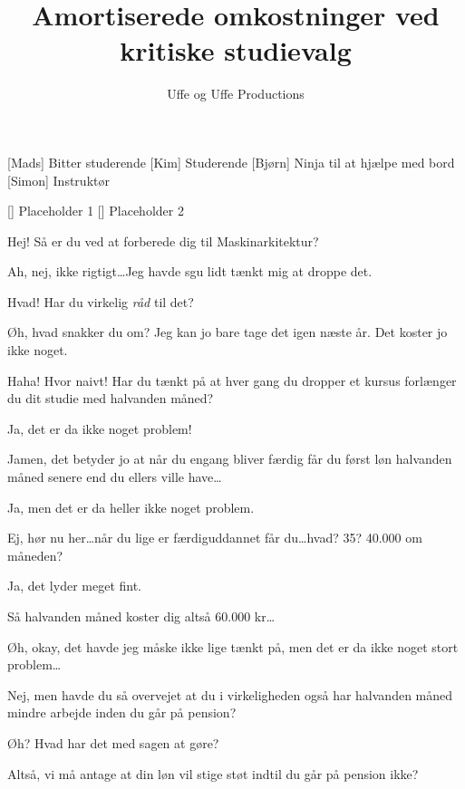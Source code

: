 \documentclass[a4paper,11pt]{article}
\title{Amortiserede omkostninger ved kritiske studievalg}
\author{Uffe og Uffe Productions\texttrademark}
\begin{document}
\maketitle

\begin{roles}
[Mads] Bitter studerende
[Kim] Studerende
[Bjørn] Ninja til at hjælpe med bord
[Simon] Instruktør
\end{roles}


\begin{props}
[] Placeholder 1
[] Placeholder 2
\end{props}

\begin{sketch}

 Hej! Så er du ved at forberede dig til Maskinarkitektur?

 Ah, nej, ikke rigtigt\dots Jeg havde sgu lidt tænkt mig at droppe det.

 Hvad! Har du virkelig \emph{råd} til det?

 Øh, hvad snakker du om? Jeg kan jo bare tage det igen næste år. Det
koster jo ikke noget.

 Haha! Hvor naivt! Har du tænkt på at hver gang du dropper et kursus
forlænger du dit studie med halvanden måned?

 Ja, det er da ikke noget problem!

 Jamen, det betyder jo at når du engang bliver færdig får du først
løn halvanden måned senere end du ellers ville have\dots

 Ja, men det er da heller ikke noget problem.

 Ej, hør nu her\dots når du lige er færdiguddannet får du\dots hvad? 35?
40.000 om måneden?

  Ja, det lyder meget fint.

 Så halvanden måned koster dig altså 60.000 kr\dots

 Øh, okay, det havde jeg måske ikke lige tænkt på, men det er da
ikke noget stort problem\dots

 Nej, men havde du så overvejet at du i virkeligheden også har
halvanden måned mindre arbejde inden du går på pension?

 Øh? Hvad har det med sagen at gøre?

 Altså, vi må antage at din løn vil stige støt indtil du går på pension ikke?


\end{sketch}
\end{document}
